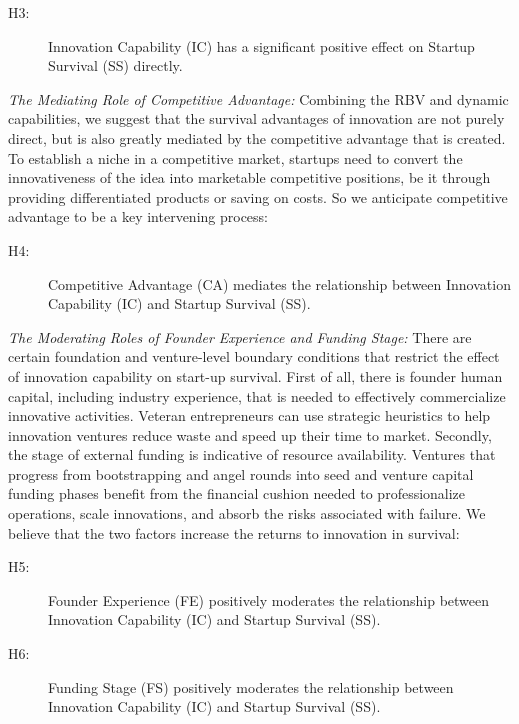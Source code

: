 \documentclass{ieeeaccess}
\begin{document}
\begin{description}
  \item[H3:] Innovation Capability (IC) has a significant positive effect on Startup Survival (SS) directly.
\end{description}

\textit{The Mediating Role of Competitive Advantage:}
Combining the RBV and dynamic capabilities, we suggest that the survival advantages of innovation are not purely direct, but is also greatly mediated by the competitive advantage that is created. To establish a niche in a competitive market, startups need to convert the innovativeness of the idea into marketable competitive positions, be it through providing differentiated products or saving on costs. So we anticipate competitive advantage to be a key intervening process:

\begin{description}
  \item[H4:] Competitive Advantage (CA) mediates the relationship between Innovation Capability (IC) and Startup Survival (SS).
\end{description}

\textit{The Moderating Roles of Founder Experience and Funding Stage:}
There are certain foundation and venture-level boundary conditions that restrict the effect of innovation capability on start-up survival. First of all, there is founder human capital, including industry experience, that is needed to effectively commercialize innovative activities. Veteran entrepreneurs can use strategic heuristics to help innovation ventures reduce waste and speed up their time to market. Secondly, the stage of external funding is indicative of resource availability. Ventures that progress from bootstrapping and angel rounds into seed and venture capital funding phases benefit from the financial cushion needed to professionalize operations, scale innovations, and absorb the risks associated with failure. We believe that the two factors increase the returns to innovation in survival:

\begin{description}
  \item[H5:] Founder Experience (FE) positively moderates the relationship between Innovation Capability (IC) and Startup Survival (SS).
  \item[H6:] Funding Stage (FS) positively moderates the relationship between Innovation Capability (IC) and Startup Survival (SS).
\end{description}
\end{document}
